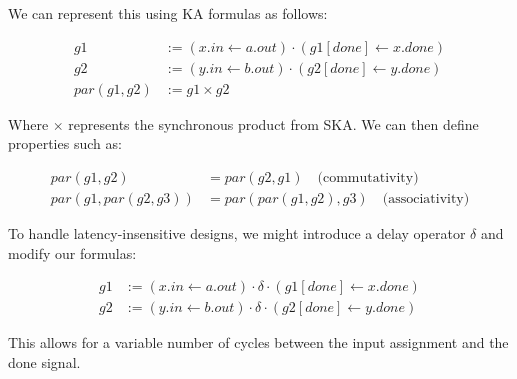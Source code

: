 \documentclass[sigplan,10pt,authorversion,nonacm]{acmart}
\newcommand{\coloneqq}{\mathrel{:=}}
\theoremstyle{remark}
\begin{document}
We can represent this using KA formulas as follows:

\begin{align*}
g1 &\coloneqq (x.in \leftarrow a.out) \cdot (g1[done] \leftarrow x.done) \\
g2 &\coloneqq (y.in \leftarrow b.out) \cdot (g2[done] \leftarrow y.done) \\
par(g1, g2) &\coloneqq g1 \times g2
\end{align*}

Where $\times$ represents the synchronous product from SKA. We can then define properties such as:

\begin{align*}
par(g1, g2) &= par(g2, g1) \quad \text{(commutativity)} \\
par(g1, par(g2, g3)) &= par(par(g1, g2), g3) \quad \text{(associativity)}
\end{align*}

To handle latency-insensitive designs, we might introduce a delay operator $\delta$ and modify our formulas:

\begin{align*}
g1 &\coloneqq (x.in \leftarrow a.out) \cdot \delta \cdot (g1[done] \leftarrow x.done) \\
g2 &\coloneqq (y.in \leftarrow b.out) \cdot \delta \cdot (g2[done] \leftarrow y.done)
\end{align*}

This allows for a variable number of cycles between the input assignment and the done signal.
\end{document}
